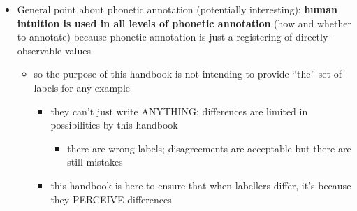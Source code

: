 \documentclass[11pt, twoside]{memoir}
\begin{document}
\begin{itemize}
\begin{itemize}
\begin{itemize}
      \begin{itemize}
      \tightlist
      \item
        maybe relating it to the fact that different speech users may
        use different cues?\\
      \item
        PoLaR will have different annotations when speakers use
        different phonetic cues for the same phonological category
        (tracking variation!)\\
      \item
        because different listeners rely on different cues, you can get
        different annotations\\
      \end{itemize}
    \end{itemize}
  \item
    General point about phonetic annotation (potentially interesting):
    \textbf{human intuition is used in all levels of phonetic
    annotation} (how and whether to annotate) because phonetic
    annotation is just a registering of directly-observable values

    \begin{itemize}
    \tightlist
    \item
      so the purpose of this handbook is not intending to provide
      ``the'' set of labels for any example

      \begin{itemize}
      \tightlist
      \item
        they can't just write ANYTHING; differences are limited in
        possibilities by this handbook

        \begin{itemize}
        \tightlist
        \item
          there are wrong labels; disagreements are acceptable but there
          are still mistakes\\
        \end{itemize}
      \item
        this handbook is here to ensure that when labellers differ, it's
        because they PERCEIVE differences


\end{itemize}
\end{itemize}
\end{itemize}
\end{itemize}
\end{document}

